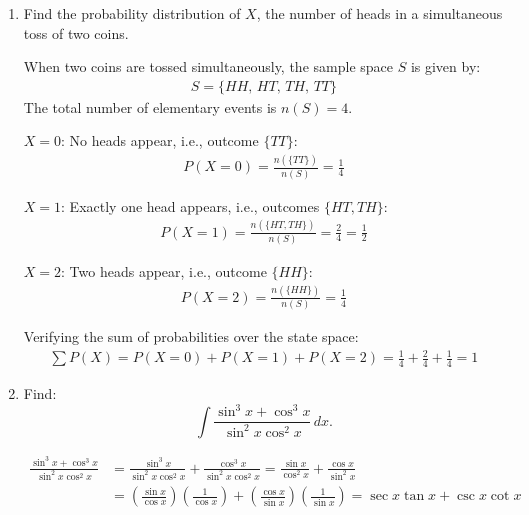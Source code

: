 \begin{enumerate}[label=\thesubsection.\arabic*, ref=\thesubsection.\theenumi]
\begin{align*}
	\text{The probability of getting 3 heads is $\dfrac{5}{16}$}.\\
	\text{The probability of getting at most 3 heads is $\dfrac{13}{16}$}.
\end{align*}



\item Find the probability distribution of $X$, the number of heads in a simultaneous toss of two coins.

\solution
When two coins are tossed simultaneously, the sample space $S$ is given by:
\begin{align*}
	S = \{HH, \, HT, \, TH, \, TT\}
\end{align*}
The total number of elementary events is $n(S) = 4$.

	 $X = 0$: No heads appear, i.e., outcome $\{TT\}$:
	\begin{align*}
		P(X = 0) = \frac{n(\{TT\})}{n(S)} = \frac{1}{4}
	\end{align*}
	
	 $X = 1$: Exactly one head appears, i.e., outcomes $\{HT, TH\}$:
	\begin{align*}
		P(X = 1) = \frac{n(\{HT, TH\})}{n(S)} = \frac{2}{4} = \frac{1}{2}
	\end{align*}
	
	 $X = 2$: Two heads appear, i.e., outcome $\{HH\}$:
	\begin{align*}
		P(X = 2) = \frac{n(\{HH\})}{n(S)} = \frac{1}{4}
	\end{align*}

Verifying the sum of probabilities over the state space:
\begin{align*}
	\sum P(X) = P(X = 0) + P(X = 1) + P(X = 2) = \frac{1}{4} + \frac{2}{4} + \frac{1}{4} = 1
\end{align*}


\item Find:
\[
\int \frac{\sin^3x+\cos^3x}{\sin^2x\cos^2x}\,dx.
\]

\solution
\begin{align*}
	\frac{\sin^3x + \cos^3x}{\sin^2x \cos^2x} &= \frac{\sin^3x}{\sin^2x \cos^2x} + \frac{\cos^3x}{\sin^2x \cos^2x} = \frac{\sin x}{\cos^2x} + \frac{\cos x}{\sin^2x} \\
	&= \left(\frac{\sin x}{\cos x}\right)\left(\frac{1}{\cos x}\right) + \left(\frac{\cos x}{\sin x}\right)\left(\frac{1}{\sin x}\right) = \sec x \tan x + \csc x \cot x
\end{align*}


\end{enumerate}
